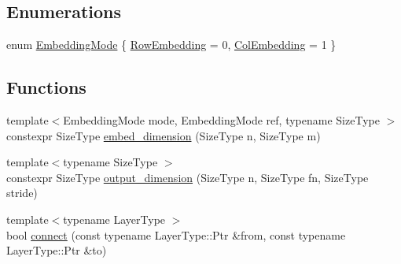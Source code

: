 \subsection*{Enumerations}
\begin{DoxyCompactItemize}
\item 
enum \hyperlink{namespaceffnn_1_1layer_a254f16beba4fb335d935e9b43bb9e69a}{Embedding\-Mode} \{ \hyperlink{namespaceffnn_1_1layer_a254f16beba4fb335d935e9b43bb9e69aa91eb0d1f175a08e2b2991cae348c827d}{Row\-Embedding} = 0, 
\hyperlink{namespaceffnn_1_1layer_a254f16beba4fb335d935e9b43bb9e69aa42ac01b35d45fd60256ef5008c96c049}{Col\-Embedding} = 1
 \}
\end{DoxyCompactItemize}
\subsection*{Functions}
\begin{DoxyCompactItemize}
\item 
{\footnotesize template$<$Embedding\-Mode mode, Embedding\-Mode ref, typename Size\-Type $>$ }\\constexpr Size\-Type \hyperlink{namespaceffnn_1_1layer_ad128f693900faa5bcf2cdd0ef8e7eee6}{embed\-\_\-dimension} (Size\-Type n, Size\-Type m)
\item 
{\footnotesize template$<$typename Size\-Type $>$ }\\constexpr Size\-Type \hyperlink{namespaceffnn_1_1layer_ac1d8b4e852293231055d1257f1e83e60}{output\-\_\-dimension} (Size\-Type n, Size\-Type fn, Size\-Type stride)
\item 
{\footnotesize template$<$typename Layer\-Type $>$ }\\bool \hyperlink{namespaceffnn_1_1layer_a33fc9c6c7eb5fbdef14e0aa0db97dd13}{connect} (const typename Layer\-Type\-::\-Ptr \&from, const typename Layer\-Type\-::\-Ptr \&to)
\end{DoxyCompactItemize}


